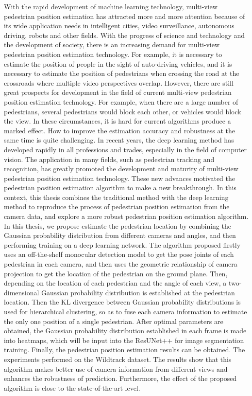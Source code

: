 \begin{abstract*}
  With the rapid development of machine learning technology, multi-view pedestrian position estimation has attracted more and more attention because of its wide application needs in intelligent cities, video surveillance, autonomous driving, robots and other fields. With the progress of science and technology and the development of society, there is an increasing demand for multi-view pedestrian position estimation technology. For example, it is necessary to estimate the position of people in the sight of auto-driving vehicles, and it is necessary to estimate the position of pedestrians when crossing the road at the crossroads where multiple video perspectives overlap. However, there are still great prospects for development in the field of current multi-view pedestrian position estimation technology. For example, when there are a large number of pedestrians, several pedestrians would block each other, or vehicles would block the view. In these circumstances, it is hard for current algorithms produce a marked effect. How to improve the estimation accuracy and robustness at the same time is quite challenging. In recent years, the deep learning method has developed rapidly in all professions and trades, especially in the field of computer vision. The application in many fields, such as pedestrian tracking and recognition, has greatly promoted the development and maturity of multi-view pedestrian position estimation technology. These new advances motivated the pedestrian position estimation algorithm to make a new breakthrough. In this context, this thesis combines the traditional method with the deep learning method to reproduce the process of pedestrian position estimation from the camera data, and explore a more robust pedestrian position estimation algorithm.
  In this thesis, we propose estimate the pedestrian location by combining the Gaussian probability distribution from different cameras and angles, and then performing training on a deep learning network. The algorithm proposed firstly uses an off-the-shelf monocular detection model to get the pose joints of each pedestrian in each camera, and then uses the geometric relationship of camera projection to get the location of the pedestrian on the ground plane. Then, depending on the location of each pedestrian and the angle of each view, a two-dimensional Gaussian probability distribution is established at the pedestrian location. Then the KL divergence between Gaussian probability distributions is used for hierarchical clustering, so as to fuse each camera information to estimate the only one position of a single pedestrian. After optimal parameters are obtained, the Gaussian probability distribution established in each frame is made into heatmaps, which will be input into the ResUNet++ for image segmentation training. Finally, the pedestrian position estimation results can be obtained. The experiments performed on the Wildtrack dataset. The results show that this algorithm makes better use of camera information from different views and enhances the robustness of prediction. Furthermore, the effect of the proposed algorithm is close to the state-of-the-art level.

\end{abstract*}

